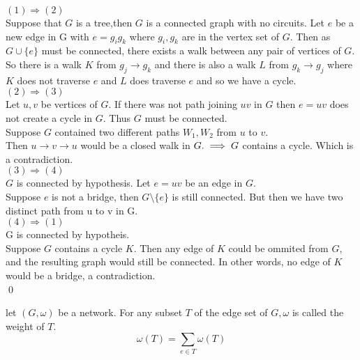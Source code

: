 \documentclass[../main.tex]{subfiles}
\begin{document}
 \noindent\Proof $(1) \Longrightarrow (2)$\\
 \noindent Suppose that $G$ is a tree,then $G$ is a connected graph with no circuits. Let $e$ be a new edge in G with $e = g_ig_k$ where $g_i,g_k$ are in the vertex set of $G.$ Then as $G \cup \{e\}$ must be connected, there exists a walk between any pair of vertices of $G$. So there is a walk $K$ from $g_j \rightarrow g_k$ and there is also a walk $L$ from $g_k \rightarrow g_j$ where $K$ does not traverse $e$ and $L$ does traverse $e$ and so we have a cycle.\\

\noindent\Proof $(2) \Longrightarrow (3)$\\
\noindent Let $u,v$ be vertices of $G.$ If there was not path joining $uv$ in $G$ then $e = uv$ does not create a cycle in $G.$ Thus $G$ must be connected.\\
\noindent Suppose $G$ contained two different paths $W_1, W_2$ from $u$ to $v.$\\
\noindent Then $ u \longrightarrow v \longrightarrow u$ would be a closed walk in $G. \\ \implies G$ contains a cycle. Which is a contradiction.\\

\noindent\Proof $(3) \Longrightarrow (4)$\\
\noindent $G$ is connected by hypothesis. Let $e = uv$ be an edge in $G.$\\
\noindent Suppose $e$ is not a bridge, then $G \setminus \{e\}$ is still connected. But then we have two distinct path from u to v in G.\\

\noindent\Proof $(4) \Longrightarrow (1)$\\
\noindent G is connected by hypotheis.\\
\noindent Suppose $G$ contains a cycle $K.$ Then any edge of $K$ could be ommited from $G,$ and the resulting graph would still be connected. In other words, no edge of $K$ would be a bridge, a contradiction.\\
\qed

\begin{defn}
let $(G,\omega)$ be a network. For any subset $T$ of the edge set of $G, \omega$ is called the weight of $T.$\\
\begin{equation}
\omega (T) = \displaystyle\sum_{e \in T} \omega (T)
\end{equation}
\end{defn}
\end{document}
